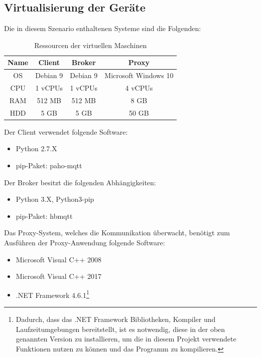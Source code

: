     \subsection{Virtualisierung der Geräte}
    Die in diesem Szenario enthaltenen Systeme sind die Folgenden:
    \begin{table}[h]
        \centering
        \begin{tabular}{c|c|c|c}
            Name & Client & Broker & Proxy \\ \hline
            OS & Debian 9 & Debian 9 & Microsoft Windows 10 \\
            CPU & 1 vCPUs & 1 vCPUs & 4 vCPUs \\
            RAM & 512 \ac{MB} & 512 \ac{MB} & 8 GB \\
            HDD & 5 GB & 5 GB & 50 GB \\
        \end{tabular}
        \caption{Ressourcen der virtuellen Maschinen}
        \label{tab:ressourcenverteilung}
    \end{table}
    
    Der Client verwendet folgende Software:
    \begin{itemize}
        \item Python 2.7.X
        \item pip-Paket: paho-mqtt
    \end{itemize}
            
    Der Broker besitzt die folgenden Abhängigkeiten:
    \begin{itemize}
        \item Python 3.X, Python3-pip
        \item pip-Paket: hbmqtt
    \end{itemize}
            
    Das Proxy-System, welches die Kommunikation überwacht, benötigt zum Ausführen der Proxy-Anwendung folgende Software:
    \begin{itemize}
        \item Microsoft Visual C++ 2008
        \item Microsoft Visual C++ 2017
        \item .NET Framework 4.6.1\footnote{Dadurch, dass das .NET Framework Bibliotheken, Kompiler und Laufzeitumgebungen bereitstellt, ist es notwendig, diese in der oben genannten Version zu installieren, um die in diesem Projekt verwendete Funktionen nutzen zu können und das Programm zu kompilieren.}
    \end{itemize}
    
